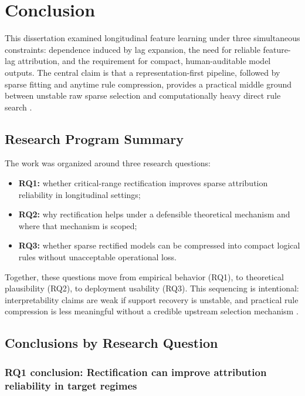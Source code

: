
\chapter{Conclusion}

This dissertation examined longitudinal feature learning under three simultaneous constraints: dependence induced by lag expansion, the need for reliable feature-lag attribution, and the requirement for compact, human-auditable model outputs. The central claim is that a representation-first pipeline, followed by sparse fitting and anytime rule compression, provides a practical middle ground between unstable raw sparse selection and computationally heavy direct rule search \autocite{orender2022,JOrender2025Efficient,JOrender2025Anytime}.

\section{Research Program Summary}

The work was organized around three research questions:
\begin{itemize}
	\item \textbf{RQ1:} whether critical-range rectification improves sparse attribution reliability in longitudinal settings;
	\item \textbf{RQ2:} why rectification helps under a defensible theoretical mechanism and where that mechanism is scoped;
	\item \textbf{RQ3:} whether sparse rectified models can be compressed into compact logical rules without unacceptable operational loss.
\end{itemize}

Together, these questions move from empirical behavior (RQ1), to theoretical plausibility (RQ2), to deployment usability (RQ3). This sequencing is intentional: interpretability claims are weak if support recovery is unstable, and practical rule compression is less meaningful without a credible upstream selection mechanism \autocite{PZhao2006model,freijeirogonzalez2022,CRudin2019Stop,WJMurdoch2019Definitions}.

\section{Conclusions by Research Question}

\subsection{RQ1 conclusion: Rectification can improve attribution reliability in target regimes}

